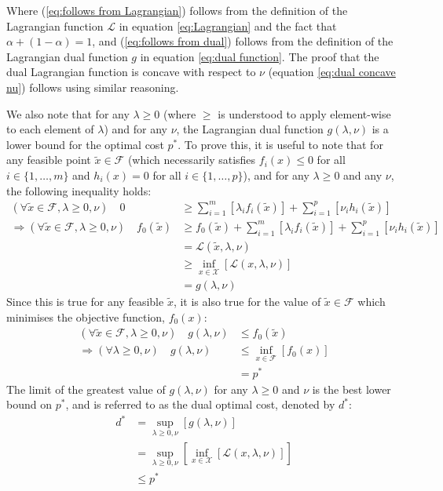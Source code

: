 Where (\ref{eq:follows from Lagrangian}) follows from the definition of the Lagrangian function $\mathcal{L}$ in equation \ref{eq:Lagrangian} and the fact that $\alpha + (1 - \alpha) = 1$, and (\ref{eq:follows from dual}) follows from the definition of the Lagrangian dual function $g$ in equation \ref{eq:dual function}. The proof that the dual Lagrangian function is concave with respect to $\nu$ (equation \ref{eq:dual concave nu}) follows using similar reasoning.

We also note that for any $\lambda \ge 0$ (where $\ge$ is understood to apply element-wise to each element of $\lambda$) and for any $\nu$, the Lagrangian dual function $g(\lambda, \nu)$ is a lower bound for the optimal cost $p^*$. To prove this, it is useful to note that for any feasible point $\tilde{x}\in\mathcal{F}$ (which necessarily satisfies $f_i(x) \le 0$ for all $i\in\{1, \hdots, m\}$ and $h_i(x) = 0$ for all $i\in\{1, \hdots, p\}$), and for any $\lambda\ge 0$ and any $\nu$, the following inequality holds:
\begin{align}
    (\forall \tilde{x} \in \mathcal{F}, \lambda \ge 0, \nu) \quad 0 &\ge \sum_{i=1}^{m}[\lambda_i f_i(\tilde{x})] + \sum_{i=1}^{p}[\nu_i h_i(\tilde{x})] \\
    \Rightarrow (\forall \tilde{x} \in \mathcal{F}, \lambda \ge 0, \nu) \quad f_0(\tilde{x}) &\ge f_0(\tilde{x}) + \sum_{i=1}^{m}[\lambda_i f_i(\tilde{x})] + \sum_{i=1}^{p}[\nu_i h_i(\tilde{x})] \\
    &= \mathcal{L}(\tilde{x}, \lambda, \nu) \\
    &\ge \underset{x\in\mathcal{X}}{\inf}\left[\mathcal{L}(x, \lambda, \nu)\right] \\
    &= g(\lambda, \nu)
\end{align}
Since this is true for any feasible $\tilde{x}$, it is also true for the value of $\tilde{x} \in \mathcal{F}$ which minimises the objective function, $f_0(x)$:
\begin{align}
    (\forall \tilde{x} \in \mathcal{F}, \lambda \ge 0, \nu) \quad g(\lambda, \nu) &\le f_0(\tilde{x}) \\
    \Rightarrow (\forall \lambda \ge 0, \nu) \quad g(\lambda, \nu) &\le \underset{x\in\mathcal{F}}{\inf}\left[f_0(x)\right] \\
    &= p^*
\end{align}
The limit of the greatest value of $g(\lambda, \nu)$ for any $\lambda \ge 0$ and $\nu$ is the best lower bound on $p^*$, and is referred to as the dual optimal cost, denoted by $d^*$:
\begin{align}
    d^* &= \underset{\lambda \ge 0, \nu}{\sup}\left[g(\lambda, \nu)\right] \\
    &= \underset{\lambda \ge 0, \nu}{\sup}\left[\underset{x\in\mathcal{X}}{\inf}\left[\mathcal{L}(x, \lambda, \nu)\right]\right] \\
    & \le p^*
\end{align}
